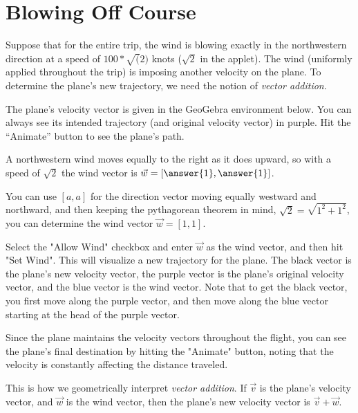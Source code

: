 \documentclass{ximera}
\begin{document}
\section*{Blowing Off Course}
  
  Suppose that for the entire trip, the wind is blowing exactly in the northwestern direction at a speed of $100*\sqrt(2)$ knots ($\sqrt{2}$ in the applet). The wind (uniformly applied throughout the trip) is imposing another velocity on the plane. To determine the plane's new trajectory, we need the notion of \textit{vector addition}.



  The plane's velocity vector is given in the GeoGebra environment below. You can always see its intended trajectory (and original velocity vector) in purple. Hit the ``Animate'' button to see the plane's path.

  A northwestern wind moves equally to the right as it does upward, so with a speed of $\sqrt{2}$ the wind vector is $\vec{w}=[\answer{1},\answer{1}]$.

  \begin{solution}

    You can use $[a,a]$ for the direction vector moving equally westward and northward, and then keeping the pythagorean theorem in mind, $\sqrt{2}=\sqrt{1^2+1^2}$, you can determine the wind vector $\vec{w}=[1,1]$.

  \end{solution}

  Select the "Allow Wind" checkbox and enter $\vec{w}$ as the wind vector, and then hit "Set Wind". This will visualize a new trajectory for the plane. The black vector is the plane's new velocity vector, the purple vector is the plane's original velocity vector, and the blue vector is the wind vector. Note that to get the black vector, you first move along the purple vector, and then move along the blue vector starting at the head of the purple vector.

  Since the plane maintains the velocity vectors throughout the flight, you can see the plane's final destination by hitting the "Animate" button, noting that the velocity is constantly affecting the distance traveled.
  \begin{center}
  \end{center}


This is how we geometrically interpret \emph{vector addition}. If $\vec{v}$ is the plane's velocity vector, and $\vec{w}$ is the wind vector, then the plane's new velocity vector is $\vec{v}+\vec{w}$. 
\end{document}

